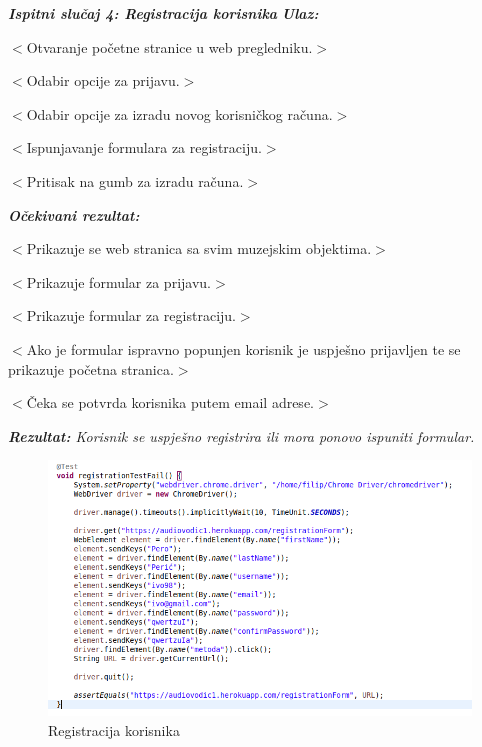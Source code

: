  	 	 
 	 	 	 \textit{\textbf{Ispitni slučaj 4: Registracija korisnika}}
 	 	 	 \newline
 	 	 	 \textit{\textbf{Ulaz:}}
 	 	 	 \begin{packed_enum}	
 	 	 	 	\item $<$Otvaranje početne stranice u web pregledniku.$>$
 	 	 	 	\item $<$Odabir opcije za prijavu.$>$
 	 	 	 	\item $<$Odabir opcije za izradu novog korisničkog računa.$>$
 	 	 	 	\item $<$Ispunjavanje formulara za registraciju.$>$
 	 	 	 	\item $<$Pritisak na gumb za izradu računa.$>$
 	 	 	 \end{packed_enum}
 	 	 	 \textit{\textbf{Očekivani rezultat:}}
 	 	 	 \begin{packed_enum}
 	 	 	 	\item $<$Prikazuje se web stranica sa svim muzejskim objektima.$>$
 	 	 	 	\item $<$Prikazuje formular za prijavu.$>$
 	 	 	 	\item $<$Prikazuje formular za registraciju.$>$
 	 	 	 	\item $<$Ako je formular ispravno popunjen korisnik je uspješno prijavljen te se prikazuje početna stranica.$>$ 
 	 	 	 	\item $<$Čeka se potvrda korisnika putem email adrese.$>$ 
 	 	 	 \end{packed_enum}
 	 	 	 \textit{\textbf{Rezultat:} Korisnik se uspješno registrira ili mora ponovo ispuniti formular.
 	 	 	 	\newline}
 	 	 	 \begin{figure}[H]
 	 	 	 	\includegraphics[scale=0.62]{slike/registrationTestFail.png}
 	 	 	 	\centering
 	 	 	 	\caption{Registracija korisnika}
 	 	 	 	\label{fig:promjene}
 	 	 	 \end{figure}
  	 	 
